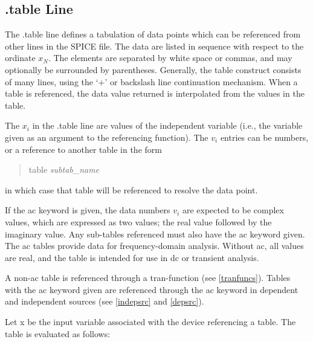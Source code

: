 \subsection{{\vt .table} Line}

The {\vt .table} line defines a tabulation of data points which can be
referenced from other lines in the SPICE file.  The data are listed in
sequence with respect to the ordinate $x_N$.  The elements are
separated by white space or commas, and may optionally be surrounded
by parentheses.  Generally, the table construct consists of many
lines, using the `+' or backslash line continuation mechanism.  When a
table is referenced, the data value returned is interpolated from the
values in the table.

The $x_i$ in the {\vt .table} line are values of the independent
variable (i.e., the variable given as an argument to the referencing
function).  The $v_i$ entries can be numbers, or a reference to
another table in the form
\begin{quote}
{\vt table} {\it subtab\_name}
\end{quote}
in which case that table will be referenced to resolve the data
point.

If the {\vt ac} keyword is given, the data numbers $v_i$ are
expected to be complex values, which are expressed as two values;
the real value followed by the imaginary value.  Any sub-tables
referenced must also have the {\vt ac} keyword given.  The {\vt ac}
tables provide data for frequency-domain analysis.  Without {\vt
ac}, all values are real, and the table is intended for use in dc or
transient analysis.

A non-ac table is referenced through a tran-function (see
\ref{tranfuncs}).  Tables with the {\vt ac} keyword given are
referenced through the {\vt ac} keyword in dependent and independent
sources (see \ref{indepsrc} and \ref{depsrc}).

Let {\vt x} be the input variable associated with the device
referencing a table.  The table is evaluated as follows:

